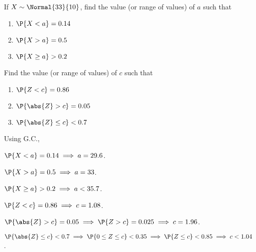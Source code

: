 \clearpage
\begin{problem}
    If $X \sim \Normal{33}{10}$, find the value (or range of values) of $a$ such that
    \begin{enumerate}
        \item $\P{X < a} = 0.14$
        \item $\P{X > a} = 0.5$
        \item $\P{X \geq a} > 0.2$
    \end{enumerate}

    Find the value (or range of values) of $c$ such that
    \begin{enumerate}
        \item $\P{Z < c} = 0.86$
        \item $\P{\abs{Z} > c} = 0.05$
        \item $\P{\abs{Z} \leq c} < 0.7$
    \end{enumerate}
\end{problem}
\begin{solution}
    Using G.C.,
    \begin{ppart}
        $\P{X < a} = 0.14 \implies a = 29.6$.
    \end{ppart}
    \begin{ppart}
        $\P{X > a} = 0.5 \implies a = 33$.
    \end{ppart}
    \begin{ppart}
        $\P{X \geq a} > 0.2 \implies a < 35.7$.
    \end{ppart}
    \begin{ppart}
        $\P{Z < c} = 0.86 \implies c = 1.08$.
    \end{ppart}
    \begin{ppart}
        $\P{\abs{Z} > c} = 0.05 \implies \P{Z > c} = 0.025 \implies c = 1.96$.
    \end{ppart}
    \begin{ppart}
        $\P{\abs{Z} \leq c} < 0.7 \implies \P{0 \leq Z \leq c} < 0.35 \implies \P{Z \leq c} < 0.85 \implies c < 1.04$.
    \end{ppart}
\end{solution}

